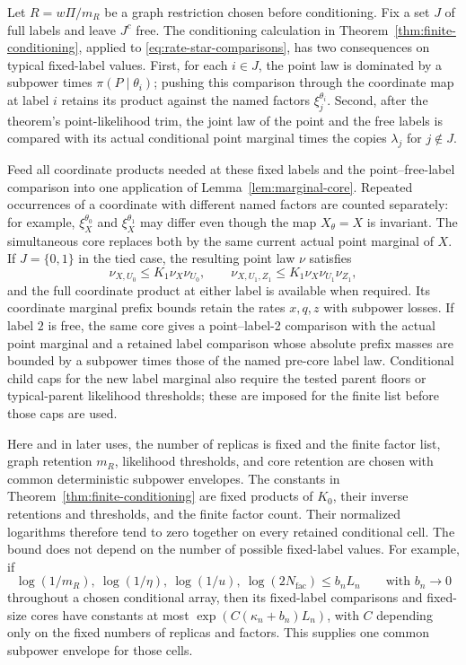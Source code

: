 Let $R=w\Pi/m_R$ be a graph restriction chosen before conditioning.
Fix a set $J$ of full labels and leave $J^c$ free.  The conditioning
calculation in Theorem~\ref{thm:finite-conditioning}, applied to
\eqref{eq:rate-star-comparisons}, has two consequences on typical
fixed-label values.  First, for each $i\in J$, the point law is
dominated by a subpower times $\pi(P\mid\theta_i)$; pushing this
comparison through the coordinate map at label $i$ retains its
product against the named factors $\xi_j^{\theta_i}$.
Second, after the theorem's point-likelihood trim, the joint law
of the point and the free labels is compared with its actual
conditional point marginal times the copies $\lambda_j$ for
$j\notin J$.

Feed all coordinate products needed at these fixed labels and the
point--free-label comparison into one application of
Lemma~\ref{lem:marginal-core}.  Repeated occurrences of a coordinate
with different named factors are counted separately: for example,
$\xi_X^{\theta_0}$ and $\xi_X^{\theta_1}$ may differ even though
the map $X_\theta=X$ is invariant.  The simultaneous core replaces
both by the same current actual point marginal of $X$.  If
$J=\{0,1\}$ in the tied case, the resulting point law $\nu$ satisfies
\begin{equation}
 \nu_{X,U_0}\le K_1\nu_X\nu_{U_0},\qquad
 \nu_{X,U_1,Z_1}\le K_1\nu_X\nu_{U_1}\nu_{Z_1},
 \label{eq:rate-both-coordinate-products}
\end{equation}
and the full coordinate product at either label is available when
required.  Its coordinate marginal prefix bounds retain the rates
$x,q,z$ with subpower losses.  If label $2$ is free, the same core
gives a point--label-2 comparison with the actual point marginal
and a retained label comparison whose absolute prefix masses are bounded
by a subpower times those of the named pre-core label law.  Conditional
child caps for the new label marginal also require the tested parent
floors or typical-parent likelihood thresholds; these are imposed for
the finite list before those caps are used.

Here and in later uses, the number of replicas is fixed and the
finite factor list, graph retention $m_R$, likelihood thresholds,
and core retention are chosen with common deterministic subpower
envelopes.  The constants in Theorem~\ref{thm:finite-conditioning}
are fixed products of $K_0$, their inverse retentions and
thresholds, and the finite factor count.  Their normalized
logarithms therefore tend to zero together on every retained
conditional cell.  The bound does not depend on the number of
possible fixed-label values.
For example, if
\[
 \log(1/m_R),\ \log(1/\eta),\ \log(1/u),\
 \log(2N_{\mathrm{fac}})\le b_nL_n
 \qquad\text{with }b_n\to0
\]
throughout a chosen conditional array, then its fixed-label
comparisons and fixed-size cores have constants at most
$\exp(C(\kappa_n+b_n)L_n)$, with $C$ depending only on the
fixed numbers of replicas and factors.  This supplies one common
subpower envelope for those cells.


